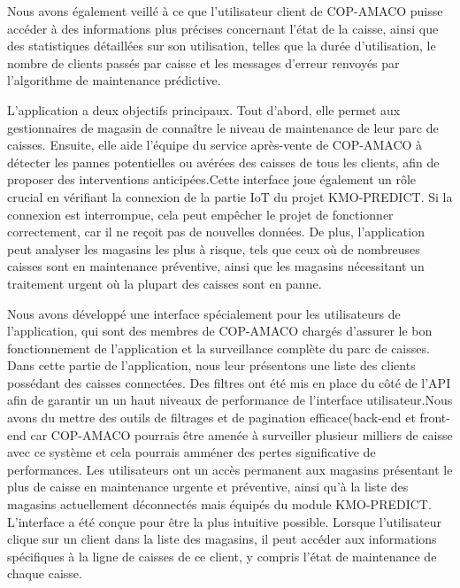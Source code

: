\documentclass[12pt]{article}
\begin{document}
\justify
 \text Nous avons également veillé à ce que l'utilisateur client de COP-AMACO puisse accéder à des informations plus précises concernant l'état de la caisse, ainsi que des statistiques détaillées sur son utilisation, telles que la durée d'utilisation, le nombre de clients passés par caisse et les messages d'erreur renvoyés par l'algorithme de maintenance prédictive.

 \justify
 \text L'application a deux objectifs principaux. Tout d'abord, elle permet aux gestionnaires de magasin de connaître le niveau de maintenance de leur parc de caisses. Ensuite, elle aide l'équipe du service après-vente de COP-AMACO à détecter les pannes potentielles ou avérées des caisses de tous les clients, afin de proposer des interventions anticipées.Cette interface joue également un rôle crucial en vérifiant la connexion de la partie IoT du projet KMO-PREDICT. Si la connexion est interrompue, cela peut empêcher le projet de fonctionner correctement, car il ne reçoit pas de nouvelles données. De plus, l'application peut analyser les magasins les plus à risque, tels que ceux où de nombreuses caisses sont en maintenance préventive, ainsi que les magasins nécessitant un traitement urgent où la plupart des caisses sont en panne.

 \justify
 \text Nous avons développé une interface  spécialement pour les utilisateurs de l'application, qui sont des membres de COP-AMACO chargés d'assurer le bon fonctionnement de l'application et la surveillance complète du parc de caisses. Dans cette partie de l'application, nous leur présentons une liste des clients possédant des caisses connectées. Des filtres ont été mis en place du côté de l'API afin de garantir un un haut niveaux de performance de l'interface utilisateur.Nous avons du mettre des outils de filtrages et de pagination efficace(back-end et front-end car COP-AMACO pourrais être amenée à surveiller plusieur milliers de caisse avec ce système et cela pourrais amméner des pertes significative de performances. Les utilisateurs ont un accès permanent aux magasins présentant le plus de caisse en maintenance urgente et préventive, ainsi qu'à la liste des magasins actuellement déconnectés mais équipés du module KMO-PREDICT. L'interface a été conçue pour être la plus intuitive possible. Lorsque l'utilisateur clique sur un client dans la liste des magasins, il peut accéder aux informations spécifiques à la ligne de caisses de ce client, y compris l'état de maintenance de chaque caisse.
\end{document}
